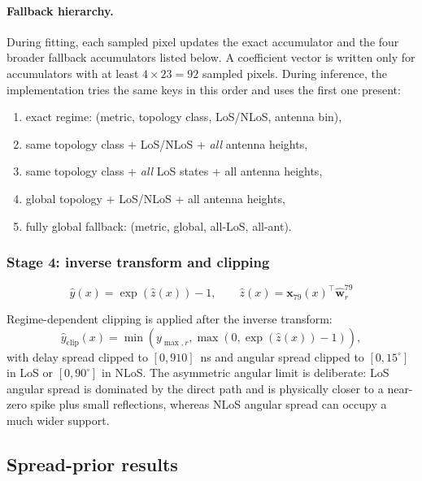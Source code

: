 \paragraph{Fallback hierarchy.} During fitting, each sampled pixel updates the
exact accumulator and the four broader fallback accumulators listed below. A
coefficient vector is written only for accumulators with at least
$4 \times 23 = 92$ sampled pixels. During inference, the implementation tries
the same keys in this order and uses the first one present:
\begin{enumerate}
\item exact regime: (metric, topology class, LoS/NLoS, antenna bin),
\item same topology class + LoS/NLoS + \emph{all} antenna heights,
\item same topology class + \emph{all} LoS states + all antenna heights,
\item global topology + LoS/NLoS + all antenna heights,
\item fully global fallback: (metric, global, all-LoS, all-ant).
\end{enumerate}

\subsubsection{Stage 4: inverse transform and clipping}

\begin{equation}
\hat y(x) = \exp\!\left(\hat z(x)\right) - 1,\qquad \hat z(x) = \textbf{x}_{79}(x)^\top \hat{\textbf{w}}^{79}_{r}
\label{eq:inv_log}
\end{equation}

Regime-dependent clipping is applied after the inverse transform:
\begin{equation}
\hat y_{\mathrm{clip}}(x)
=
\min\!\left(
y_{\max,r},
\max\!\left(0,\exp(\hat z(x))-1\right)
\right),
\label{eq:try79_clip}
\end{equation}
with delay spread clipped to $[0, 910]$~ns and angular spread clipped to
$[0, 15^\circ]$ in LoS or $[0, 90^\circ]$ in NLoS. The asymmetric angular
limit is deliberate: LoS angular spread is dominated by the direct path and is
physically closer to a near-zero spike plus small reflections, whereas NLoS
angular spread can occupy a much wider support.

\subsection{Spread-prior results}

